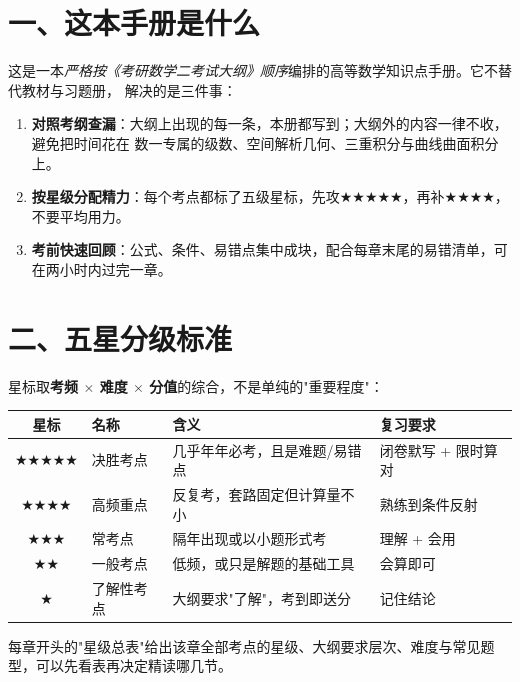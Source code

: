 \section*{一、这本手册是什么}

这是一本\emph{严格按《考研数学二考试大纲》顺序}编排的高等数学知识点手册。它不替代教材与习题册，
解决的是三件事：

\begin{enumerate}
  \item \textbf{对照考纲查漏}：大纲上出现的每一条，本册都写到；大纲外的内容一律不收，避免把时间花在
        数一专属的级数、空间解析几何、三重积分与曲线曲面积分上。
  \item \textbf{按星级分配精力}：每个考点都标了五级星标，先攻$\bigstar\bigstar\bigstar\bigstar\bigstar$，再补$\bigstar\bigstar\bigstar\bigstar$，不要平均用力。
  \item \textbf{考前快速回顾}：公式、条件、易错点集中成块，配合每章末尾的易错清单，可在两小时内过完一章。
\end{enumerate}

\section*{二、五星分级标准}

星标取\textbf{考频 $\times$ 难度 $\times$ 分值}的综合，不是单纯的"重要程度"：

\begin{center}
\begin{tabular}{@{}clll@{}}
\toprule
\textbf{星标} & \textbf{名称} & \textbf{含义} & \textbf{复习要求} \\
\midrule
$\bigstar\bigstar\bigstar\bigstar\bigstar$ & 决胜考点 & 几乎年年必考，且是难题/易错点 & 闭卷默写 + 限时算对 \\
$\bigstar\bigstar\bigstar\bigstar$ & 高频重点 & 反复考，套路固定但计算量不小 & 熟练到条件反射 \\
$\bigstar\bigstar\bigstar$ & 常考点 & 隔年出现或以小题形式考 & 理解 + 会用 \\
$\bigstar\bigstar$ & 一般考点 & 低频，或只是解题的基础工具 & 会算即可 \\
$\bigstar$ & 了解性考点 & 大纲要求"了解"，考到即送分 & 记住结论 \\
\bottomrule
\end{tabular}
\end{center}

每章开头的"星级总表"给出该章全部考点的星级、大纲要求层次、难度与常见题型，可以先看表再决定精读哪几节。


